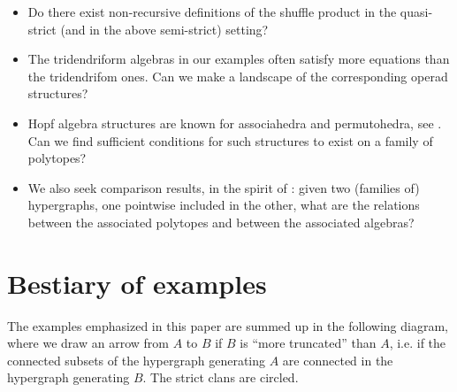\begin{itemize}
\item Do there exist  non-recursive definitions of the shuffle product in the quasi-strict (and in the above  semi-strict) setting?

\item The tridendriform algebras in our examples often satisfy more equations than the tridendrifom ones. Can we make a landscape of the corresponding operad structures?
 
\item Hopf algebra structures are known for associahedra and permutohedra, see \cite{BR,LR-planar-Hopf}. Can we find sufficient conditions for such structures to exist on a family of polytopes?

\item We also seek comparison results, in the spirit of \cite{LR-planar-Hopf,PalaciosRonco}: given two (families of)  hypergraphs, one pointwise included in the other, what are the relations between the associated polytopes  and between the associated algebras?
\end{itemize}

\section*{Bestiary of examples}
The examples emphasized in this paper are summed up in the following diagram, where we draw an arrow from $A$ to $B$ if $B$ is ``more truncated'' than $A$, i.e. if the connected subsets of the hypergraph  generating $A$ are connected in the hypergraph generating $B$.
The strict clans are circled.

\begin{center}
\end{center}

